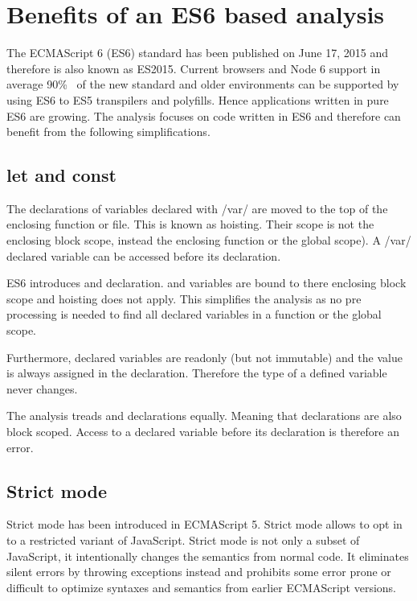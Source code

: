 \section{Benefits of an ES6 based analysis}
The ECMAScript 6 (ES6) standard has been published on June 17, 2015 and therefore is also known as ES2015. Current browsers and Node 6 support in average 90\%~\cite{Kangax2016} of the new standard and older environments can be supported by using ES6 to ES5 transpilers and polyfills. Hence applications written in pure ES6 are growing. The analysis focuses on code written in ES6 and therefore can benefit from the following simplifications.

\subsection{let and const}
The declarations of variables declared with \javascriptinline/var/ are moved to the top of the enclosing function or file. This is known as hoisting. Their scope is not the enclosing block scope, instead the enclosing function or the global scope). A \javascriptinline/var/ declared variable can be accessed before its declaration. 

ES6 introduces  and  declaration.  and  variables are bound to there enclosing block scope and hoisting does not apply. This simplifies the analysis as no pre processing is needed to find all declared variables in a function or the global scope. 

Furthermore,  declared variables are readonly (but not immutable) and the value is always assigned in the declaration. Therefore the type of a  defined variable never changes.

The analysis treads  and  declarations equally. Meaning that  declarations are also block scoped. Access to a  declared variable before its declaration is therefore an error.

\subsection{Strict mode}
Strict mode has been introduced in ECMAScript 5. Strict mode allows to opt in to a restricted variant of JavaScript. Strict mode is not only a subset of JavaScript, it intentionally changes the semantics from normal code. It eliminates silent errors by throwing exceptions instead and prohibits some error prone or difficult to optimize syntaxes and semantics from earlier ECMAScript versions. 

